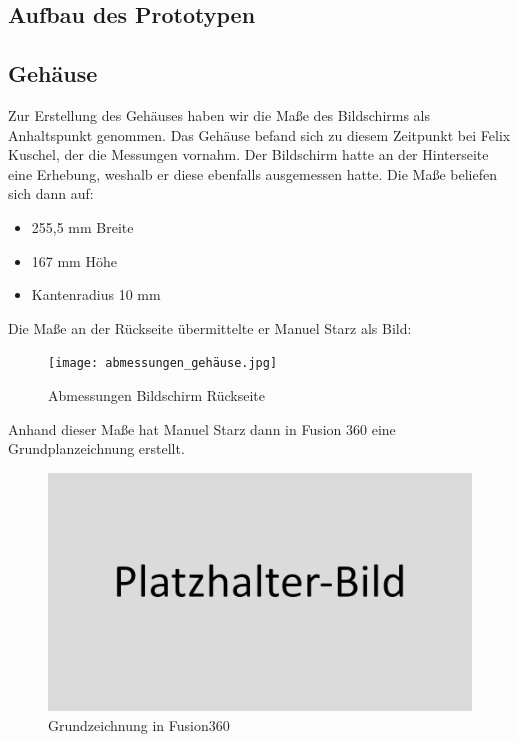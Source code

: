 \documentclass[12pt,a4paper]{article}
\begin{document}
	\subsection{Aufbau des Prototypen}
	\subsection{Gehäuse}
	Zur Erstellung des Gehäuses haben wir die Maße des Bildschirms als Anhaltspunkt genommen. Das Gehäuse befand sich zu diesem Zeitpunkt bei Felix Kuschel, der die Messungen vornahm. Der Bildschirm hatte an der Hinterseite eine Erhebung, weshalb er diese ebenfalls ausgemessen hatte. Die Maße beliefen sich dann auf:
	\begin{itemize}
		\item 255,5 mm Breite
		\item 167 mm Höhe
		\item Kantenradius 10 mm
	\end{itemize}
	Die Maße an der Rückseite übermittelte er Manuel Starz als Bild:
	\begin{figure}
		\texttt{[image: abmessungen\_gehäuse.jpg]}
		\caption[Abmessungen Bildschirm Rückseite]{Abmessungen Bildschirm Rückseite}
		\label{fig:screen-back-01}
	\end{figure}
	Anhand dieser Maße hat Manuel Starz dann in Fusion 360 eine Grundplanzeichnung erstellt.
	\begin{figure}
		\includegraphics[width=1\textwidth]{placeholder.png}
		\caption[Grundzeichnung in Fusion360]{Grundzeichnung in Fusion360}
		\label{fig:case-step-1}
	\end{figure}
\end{document}
